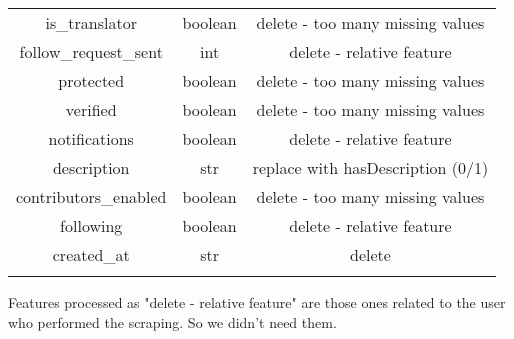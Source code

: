 \begin{center}
\begin{tabular}{ccc}
		is\_translator&boolean&delete - too many missing values\\
		follow\_request\_sent&int&delete - relative feature\\
		protected&boolean&delete - too many missing values\\
		verified&boolean&delete - too many missing values\\
		notifications&boolean&delete - relative feature\\
		description&str&replace with hasDescription (0/1)\\
		contributors\_enabled&boolean&delete - too many missing values\\
		following&boolean&delete - relative feature\\
		created\_at&str&delete\\\hline\\
	\end{tabular}
\end{center}
\normalsize
Features processed as "delete - relative feature" are those ones related to the user who performed the scraping. So we didn't need them.

